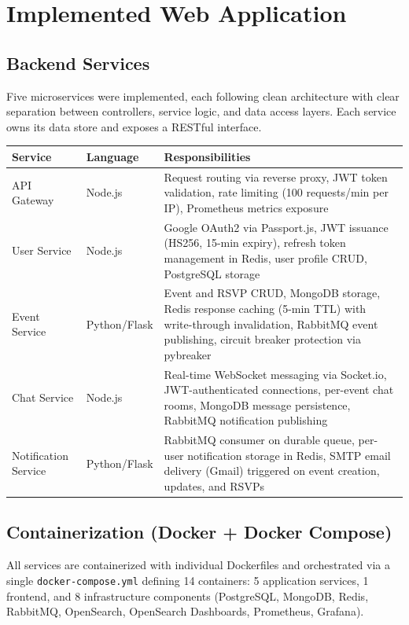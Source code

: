 \documentclass[12pt,a4paper]{article}
\begin{document}
\section{Implemented Web Application}

\subsection{Backend Services}

Five microservices were implemented, each following clean architecture with clear separation between controllers, service logic, and data access layers. Each service owns its data store and exposes a RESTful interface.

\begin{longtable}{@{}p{3.5cm}p{2.5cm}p{7.5cm}@{}}
\toprule
\textbf{Service} & \textbf{Language} & \textbf{Responsibilities} \\
\midrule
API Gateway & Node.js & Request routing via reverse proxy, JWT token validation, rate limiting (100 requests/min per IP), Prometheus metrics exposure \\
\midrule
User Service & Node.js & Google OAuth2 via Passport.js, JWT issuance (HS256, 15-min expiry), refresh token management in Redis, user profile CRUD, PostgreSQL storage \\
\midrule
Event Service & Python/Flask & Event and RSVP CRUD, MongoDB storage, Redis response caching (5-min TTL) with write-through invalidation, RabbitMQ event publishing, circuit breaker protection via pybreaker \\
\midrule
Chat Service & Node.js & Real-time WebSocket messaging via Socket.io, JWT-authenticated connections, per-event chat rooms, MongoDB message persistence, RabbitMQ notification publishing \\
\midrule
Notification Service & Python/Flask & RabbitMQ consumer on durable queue, per-user notification storage in Redis, SMTP email delivery (Gmail) triggered on event creation, updates, and RSVPs \\
\bottomrule
\end{longtable}

\subsection{Containerization (Docker + Docker Compose)}

All services are containerized with individual Dockerfiles and orchestrated via a single \texttt{docker-compose.yml} defining 14 containers: 5 application services, 1 frontend, and 8 infrastructure components (PostgreSQL, MongoDB, Redis, RabbitMQ, OpenSearch, OpenSearch Dashboards, Prometheus, Grafana).
\end{document}
